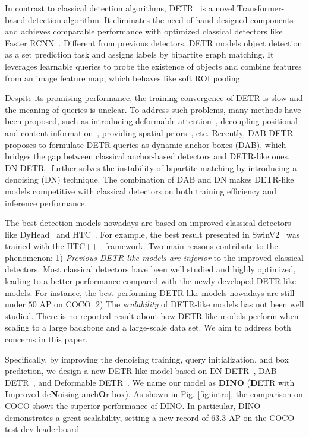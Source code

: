 \documentclass[runningheads]{llncs}
\newcommand{\modelname}{{DINO}}
\begin{document}
In contrast to classical detection algorithms, DETR~\cite{carion2020end} is a novel Transformer-based detection algorithm. It eliminates the need of hand-designed components and achieves comparable performance with optimized classical detectors like Faster RCNN~\cite{RenHG017}. Different from previous detectors, DETR models object detection as a set prediction task and assigns labels by bipartite graph matching. It leverages learnable queries to probe the existence of objects and combine features from an image feature map, which behaves like soft ROI pooling~\cite{liu2022dab}.

Despite its promising performance, the training convergence of DETR is slow and the meaning of queries is unclear. To address such problems, many methods have been proposed, such as introducing deformable attention~\cite{zhu2020deformable}, decoupling positional and content information~\cite{meng2021conditional}, providing spatial priors~\cite{gao2021fast,yao2021efficient,wang2021anchor}, etc. Recently, DAB-DETR~\cite{liu2022dab} proposes to formulate DETR queries as dynamic anchor boxes (DAB), which bridges the gap between classical anchor-based detectors and DETR-like ones. DN-DETR~\cite{li2022dn} further solves the instability of bipartite matching by introducing a denoising (DN) technique. The combination of DAB and DN makes DETR-like models competitive with classical detectors on both training efficiency and inference performance.


The best detection models nowadays are based on improved classical detectors like DyHead~\cite{Dai_2021_ICCV} and HTC~\cite{chen2019hybrid}. For example, the best result presented in SwinV2~\cite{liu2021swinv2} was trained with the HTC++~\cite{chen2019hybrid,liu2021swin} framework. 
Two main reasons contribute to the phenomenon: 1) 
\textit{Previous DETR-like models are inferior} to the improved classical detectors. Most classical detectors have been well studied and highly optimized, leading to a better performance compared with the newly developed DETR-like models. For instance, the best performing DETR-like models nowadays are still under $50$ AP on COCO.  
2) The \textit{scalability} of DETR-like models has not been well studied. There is no reported result about how DETR-like models perform when scaling to a large backbone and a large-scale data set. We aim to address both concerns in this paper.


Specifically, by improving the denoising training, query initialization, and box prediction, we 
design a new DETR-like model based on DN-DETR~\cite{li2022dn},  DAB-DETR~\cite{liu2022dab}, and Deformable DETR~\cite{zhu2020deformable}. 
We name our model as \textbf{\modelname} (\textbf{D}ETR with \textbf{I}mproved de\textbf{N}oising anch\textbf{O}r box).
As shown in Fig. \ref{fig:intro}, the comparison on COCO shows the superior performance of {\modelname}.
In particular, {\modelname} demonstrates a great scalability, setting a new record of $63.3$ AP on the COCO test-dev leaderboard \cite{paperwithcode}
\end{document}
